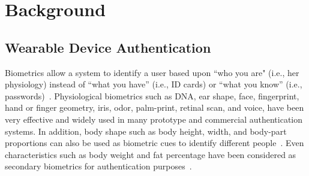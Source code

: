 \section{Background}
\label{sec:background}

\subsection{Wearable Device Authentication}






Biometrics allow a system to identify a user based upon ``who you
are" (i.e., her physiology) instead of ``what you
have'' (i.e., ID cards) or ``what you know'' (i.e.,
passwords)~\cite{jain2004introduction,o2003comparing,yampolskiy2007motor}.
Physiological biometrics such as DNA, ear shape, face, fingerprint,
hand or finger geometry,
iris, odor, palm-print, retinal scan, and voice, have been very effective and
widely used in many prototype and commercial authentication systems.
In addition, body shape such as body height, width, and body-part proportions
can also be used as biometric cues to identify different
people~\cite{collins2002silhouette}. Even characteristics such as
body weight and fat percentage have been considered as secondary biometrics
for authentication purposes~\cite{ailisto2006soft}. 

